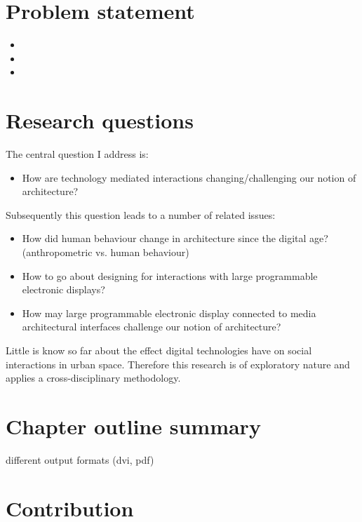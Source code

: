 \section{Problem statement}

\begin{itemize} 

  \item 
  
  \item 
  
  \item 
  
  
\end{itemize}

 
\section{Research questions}

 
The central question I address is:
\begin{itemize}
  \item How are technology mediated interactions changing/challenging our notion of architecture?
  \end{itemize}
  
\noindent Subsequently this question leads to a number of related issues:
  
 \begin{itemize} 
  \item How did human behaviour change in architecture since the digital age? (anthropometric vs. human behaviour)
  \item How to go about designing for interactions with large programmable electronic displays?
  \item How may large programmable electronic display connected to media architectural interfaces challenge our notion of architecture?
\end{itemize}


Little is know so far about the effect digital technologies have on social interactions in urban space. Therefore this research is of exploratory nature and applies a cross-disciplinary methodology.  


\section{Chapter outline summary}

different output formats (dvi, pdf)

\section{Contribution}

